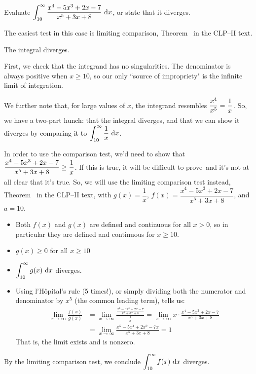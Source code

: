 \begin{question}
Evaluate $\displaystyle\int_{10}^\infty \frac{x^4-5x^3+2x-7}{x^5+3x+8} ~\mathrm{d}x$, or state that it diverges.
\end{question}
\begin{hint}
The easiest test in this case is  limiting comparison, Theorem~ in the CLP--II text.
\end{hint}
\begin{answer}
The integral diverges.
\end{answer}
\begin{solution}
First, we check that the integrand has no singularities. The denominator is always positive when $x \ge 10$, so our only ``source of impropriety" is the infinite limit of integration.

We further note that, for large values of $x$, the integrand resembles $\dfrac{x^4}{x^5} = \dfrac{1}{x\vphantom{\frac12}}$. So, we have a two-part hunch: that the integral diverges, and that we can show it diverges by comparing it to $\displaystyle\int_{10}^\infty \frac{1}{x}~\mathrm{d}x$.

In order to use the comparison test, we'd need to show that $\displaystyle\frac{x^4-5x^3+2x-7}{x^5+3x+8}  \geq \frac{1}{\vphantom{\frac12}x}$. If this is true, it will be difficult to prove--and it's not at all clear that it's true. So, we will use the limiting comparison test instead, Theorem~ in the CLP--II text, with $g(x)= \dfrac{1}{x}$,
$f(x)=\dfrac{x^4-5x^3+2x-7}{x^5+3x+8} $, and $a=10$.

\begin{itemize}
\item Both $f(x)$ and $g(x)$ are defined and continuous for all $x >0$, so in particular they are defined and continuous for $x \geq 10$.
\item $g(x) \geq 0$ for all $x \geq 10$
\item $\displaystyle\int_{10}^\infty g(x)~\mathrm{d}x$ diverges.
\item Using  l'H\^opital's rule (5 times!), or simply dividing both the numerator
           and denominator by $x^5$ (the common leading term), tells us:
\begin{align*}
\lim_{x \to \infty} \frac{f(x)}{g(x)}&=
\lim_{x \to \infty} \frac{\frac{x^4-5x^3+2x-7}{x^5+3x+8} }{ \frac{1}{x}}=
\lim_{x \to \infty} x\cdot\frac{x^4-5x^3+2x-7}{x^5+3x+8} \\
&=\lim_{x \to \infty} \frac{x^5-5x^4+2x^2-7x}{x^5+3x+8} =1
\end{align*}
That is, the limit exists and is nonzero.
\end{itemize}
By the limiting comparison test, we conclude $\displaystyle\int_{10}^\infty f(x)~\mathrm{d}x$ diverges.
\end{solution}
